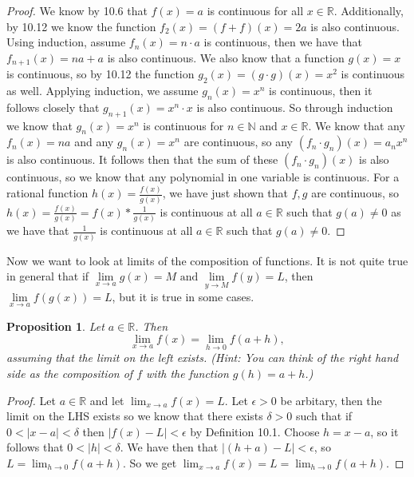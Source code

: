 \documentclass[12pt]{article}
\newcommand{\bbN}{\mathbb{N}}
\newcommand{\bbR}{\mathbb{R}}
\providecommand{\abs}[1]{\lvert #1 \rvert}
\renewcommand{\_}[1]{\underline{ #1 }}
\newtheorem{proposition}[theorem]{Proposition}
\theoremstyle{definition}
\numberwithin{equation}{subsection}
\begin{document}
\begin{proof}
We know by 10.6 that $f(x) = a$ is continuous for all $x \in \bbR$. Additionally, by 10.12 we know the function $f_2(x) = (f + f)(x) = 2a$ is also continuous. Using induction, assume $f_n(x) = n \cdot a$ is continuous, then we have that $f_{n + 1}(x) = na + a$ is also continuous. We also know that a function $g(x) = x$ is continuous, so by 10.12 the function $g_2(x) = (g \cdot g)(x) = x^2$ is continuous as well. Applying induction, we assume $g_n(x) = x^n$ is continuous, then it follows closely that $g_{n+1}(x) = x^n \cdot x$ is also continuous. So through induction we know that $g_n(x) = x^n$ is continuous for $n \in \bbN$ and $x \in \bbR$.  \newline
We know that any $f_n(x) = na$ and any $g_n(x) = x^n$ are continuous, so any $(f_n \cdot g_n)(x) = a_nx^n$ is also continuous. It follows then that the sum of these $(f_n \cdot g_n)(x)$ is also continuous, so we know that any polynomial in one variable is continuous. \newline
For a rational function $h(x) = \frac{f(x)}{g(x)}$, we have just shown that $f,g$ are continuous, so $h(x) = \frac{f(x)}{g(x)} = f(x) * \frac{1}{g(x)}$ is continuous at all $a \in \bbR$ such that $g(a) \not = 0$ as we have that $\frac{1}{g(x)}$ is continuous at all $a \in \bbR$ such that $g(a) \not = 0$. 
\end{proof}

Now we want to look at limits of the composition of functions. It is not quite true in general that if
$\lim\limits_{x\to a}g(x)=M\text{ and }\lim\limits_{y\to M}f(y)=L$,
then $\lim\limits_{x\to a}f(g(x))=L$, but it is true in some cases.


\begin{proposition}

Let $a\in\bbR$.  Then 
$$\lim\limits_{x\to a}f(x)=\lim\limits_{h\to 0}f(a+h),$$
assuming that the limit on the left exists. (Hint:  
You can think of the right hand side as the composition of $f$ with the function $g(h)=a+h$.)
\end{proposition}

\begin{proof}
Let $a \in \bbR$ and let $\lim_{x \to a}f(x) = L$. Let $\epsilon > 0$ be arbitary, then the limit on the LHS exists so we know that there exists $\delta > 0$ such that if $0 < \abs{x - a} < \delta$ then $\abs{f(x) - L} < \epsilon$ by Definition 10.1. Choose $h = x - a$, so it follows that $0 < \abs{h} < \delta$. We have then that $\abs{(h + a) - L} < \epsilon$, so $L = \lim_{h \to 0}f(a + h)$. So we get $\lim_{x \to a}f(x) = L = \lim_{h \to 0}f(a + h)$.
\end{proof}
\end{document}

